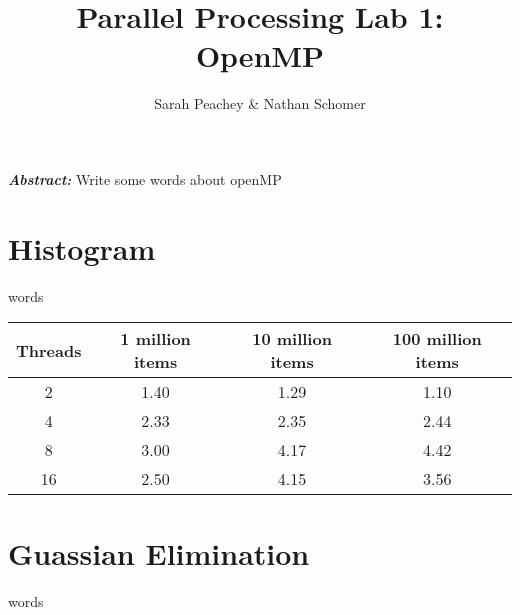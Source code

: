 \documentclass[12pt]{article}
\begin{document}
\title{Parallel Processing Lab 1: OpenMP}
\author{Sarah Peachey \& Nathan Schomer}
\maketitle

\textbf{\textit{Abstract:}} Write some words about openMP

\newpage

\tableofcontents

\newpage


\section{Histogram\label{histo}}
\qquad words 

\begin{center}
\begin{tabular}{|c|c|c|c|}
\hline 
Threads & 1 million items & 10 million items & 100 million items \\
\hline 
2 & 1.40 & 1.29 & 1.10 \\
\hline
4 & 2.33 & 2.35 & 2.44 \\
\hline
8 & 3.00 & 4.17 & 4.42 \\
\hline 
16 & 2.50 & 4.15 & 3.56
\hline 
\end{tabular}
\end{center}


\section{Guassian Elimination\label{guass}}
\qquad words 
\end{document}
